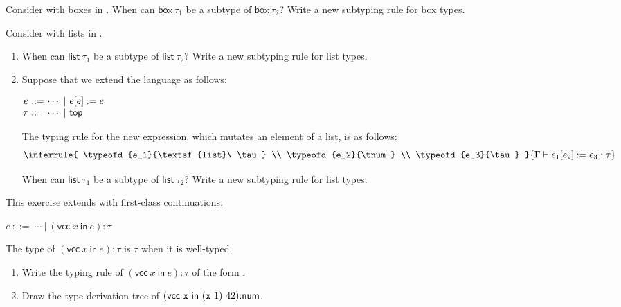 \begin{exercise}

Consider \plang with boxes in .
  When can $\textsf{box}\ \tau_1$ be a subtype of $\textsf{box}\ \tau_2$?
  Write a new subtyping rule for box types.

\end{exercise}

\begin{exercise}

Consider \plang with lists in .
  \begin{enumerate}
    \item When can $\textsf{list}\ \tau_1$ be a subtype of $\textsf{list}\
      \tau_2$? Write a new subtyping rule for list types.
    \item Suppose that we extend the language as follows:

      \vspace{0.5em}
      $\begin{array}{@{}r@{~}r@{~}l@{}}
        e & ::= & \cdots\ |\ e[e]:=e \\
        \tau & ::= & \cdots\ |\ \ttop \\
      \end{array}$
      \vspace{0.5em}

      The typing rule for the new expression, which mutates an element of a
      list, is as follows:
      \[
        \inferrule
        { \typeofd{e_1}{\textsf{list}\ \tau} \\
          \typeofd{e_2}{\tnum} \\
          \typeofd{e_3}{\tau}
        }
        { \typeofd{e_1[e_2]:=e_3}{\tau} }
      \]

      When can $\textsf{list}\ \tau_1$ be a subtype of $\textsf{list}\
      \tau_2$? Write a new subtyping rule for list types.
  \end{enumerate}

\end{exercise}

\begin{exercise}

This exercise extends \lang with first-class continuations.

    \vspace{0.5em}
    $e\ ::=\ \cdots\ |\ (\textsf{vcc}\ x\ \textsf{in}\ e){:}\tau$
    \vspace{0.5em}

    The type of
    $(\textsf{vcc}\ x\ \textsf{in}\ e){:}\tau$ is $\tau$ when it is well-typed.

\begin{enumerate}
  \item
    Write the typing rule of $(\textsf{vcc}\ x\ \textsf{in}\ e){:}\tau$
    of the form .
  \item Draw the type derivation tree of
    $(\textsf{vcc}\ {\code{x}}\ \textsf{in}\ {\eapp{(\eapp{\code{x}}{1})}{42}}){:}\tnum$.
\end{enumerate}

\end{exercise}

